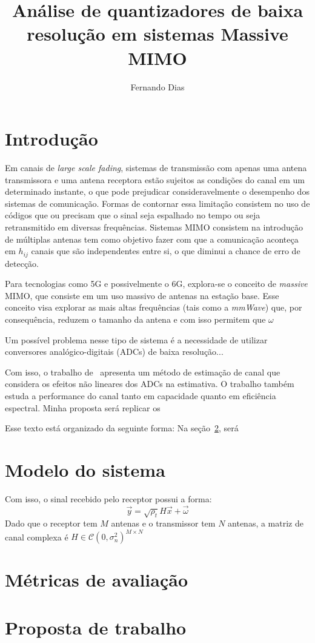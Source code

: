 \documentclass{article}
\title{Análise de quantizadores de baixa resolução em sistemas Massive MIMO}
\author{Fernando Dias}
\date{}
\begin{document}
	\maketitle
	
	\section{Introdução}
	Em canais de \textit{large scale fading}, sistemas de transmissão com apenas uma antena transmissora e uma antena receptora estão sujeitos as condições do canal em um determinado instante, o que pode prejudicar consideravelmente o desempenho dos sistemas de comunicação. Formas de contornar essa limitação consistem no uso de códigos que ou precisam que o sinal seja espalhado no tempo ou seja retransmitido em diversas frequências. Sistemas MIMO consistem na introdução de múltiplas antenas tem como objetivo fazer com que a comunicação aconteça em $h_{ij}$ canais que são independentes entre si, o que diminui a chance de erro de detecção. 

	Para tecnologias como 5G e possivelmente o 6G, explora-se o conceito de \textit{massive} MIMO, que consiste em um uso massivo de antenas na estação base. Esse conceito visa explorar as mais altas frequências (tais como a \textit{mmWave}) que, por consequência, reduzem o tamanho da antena e com isso permitem que $\omega$

	Um possível problema nesse tipo de sistema é a necessidade de utilizar conversores analógico-digitais (ADCs) de baixa resolução... 

	Com isso, o trabalho de~\cite{li.etal_2017a} apresenta um método de estimação de canal que considera os efeitos não lineares dos ADCs na estimativa. O trabalho também estuda a performance do canal tanto em capacidade quanto em eficiência espectral. Minha proposta será replicar os 

	Esse texto está organizado da seguinte forma:
	Na seção~\ref{sec:modelo_sistema}, será 

	\section{Modelo do sistema}
	\label{sec:modelo_sistema}

	Com isso, o sinal recebido pelo receptor possui a forma:
	\begin{equation}
		\vec{y}=\sqrt{\rho_t}H\vec{x}+\vec{\omega}
		\label{eq:recepcao_sinal_mimo}
	\end{equation}
	Dado que o receptor tem $M$ antenas e o transmissor tem $N$ antenas, a matriz de canal complexa é $H\in\mathcal{C}(0,\sigma_n^2)^{M\times N}$


	\section{Métricas de avaliação}
	\label{sec:metricas_avaliacao}
		

	\section{Proposta de trabalho}
	\label{sec:proposta_trabalho}


	
	
\end{document}
